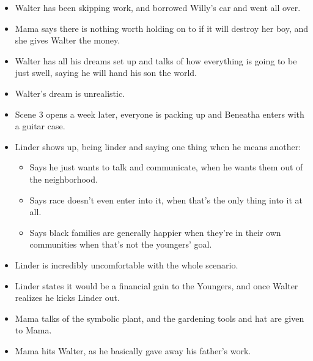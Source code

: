 \documentclass[11pt]{article}
\begin{document}
\begin{itemize}
	\item Walter has been skipping work, and borrowed Willy's car and went all 
		over.
	\item Mama says there is nothing worth holding on to if it will destroy her
		boy, and she gives Walter the money.
	\item Walter has all his dreams set up and talks of how everything is going
		to be just swell, saying he will hand his son the world.
	\item Walter's dream is unrealistic.
	\item Scene 3 opens a week later, everyone is packing up and Beneatha enters
		with a guitar case.
	\item Linder shows up, being linder and saying one thing when he means another:
		\begin{itemize}
			\item Says he just wants to talk and communicate, when he wants them
				out of the neighborhood.
			\item Says race doesn't even enter into it, when that's the only thing 
				into it at all.
			\item Says black families are generally happier when they're in their own
				communities when that's not the youngers' goal.
		\end{itemize}
	\item Linder is incredibly uncomfortable with the whole scenario.
	\item Linder states it would be a financial gain to the Youngers, and once
		Walter realizes he kicks Linder out.
	\item Mama talks of the symbolic plant, and the gardening tools and hat are
		given to Mama.
	\item Mama hits Walter, as he basically gave away his father's work.
\end{itemize}
\end{document}
